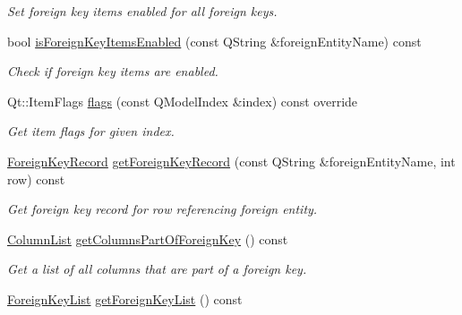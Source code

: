 \begin{DoxyCompactItemize}
\begin{DoxyCompactList}\small\item\em Set foreign key items enabled for all foreign keys. \end{DoxyCompactList}\item 
bool \hyperlink{class_mdt_1_1_item_model_1_1_foreign_key_proxy_model_a4386d35da6f92fc334166e159c7723ed}{is\+Foreign\+Key\+Items\+Enabled} (const Q\+String \&foreign\+Entity\+Name) const 
\begin{DoxyCompactList}\small\item\em Check if foreign key items are enabled. \end{DoxyCompactList}\item 
Qt\+::\+Item\+Flags \hyperlink{class_mdt_1_1_item_model_1_1_foreign_key_proxy_model_a0771f809a256b07ef5da42ef041eecaf}{flags} (const Q\+Model\+Index \&index) const override\hypertarget{class_mdt_1_1_item_model_1_1_foreign_key_proxy_model_a0771f809a256b07ef5da42ef041eecaf}{}\label{class_mdt_1_1_item_model_1_1_foreign_key_proxy_model_a0771f809a256b07ef5da42ef041eecaf}

\begin{DoxyCompactList}\small\item\em Get item flags for given index. \end{DoxyCompactList}\item 
\hyperlink{class_mdt_1_1_item_model_1_1_foreign_key_record}{Foreign\+Key\+Record} \hyperlink{class_mdt_1_1_item_model_1_1_foreign_key_proxy_model_a436611e101677f701e98149de521efb3}{get\+Foreign\+Key\+Record} (const Q\+String \&foreign\+Entity\+Name, int row) const 
\begin{DoxyCompactList}\small\item\em Get foreign key record for row referencing foreign entity. \end{DoxyCompactList}\item 
\hyperlink{class_mdt_1_1_item_model_1_1_column_list}{Column\+List} \hyperlink{class_mdt_1_1_item_model_1_1_foreign_key_proxy_model_a47df24ec15a396736946a3de697af50f}{get\+Columns\+Part\+Of\+Foreign\+Key} () const \hypertarget{class_mdt_1_1_item_model_1_1_foreign_key_proxy_model_a47df24ec15a396736946a3de697af50f}{}\label{class_mdt_1_1_item_model_1_1_foreign_key_proxy_model_a47df24ec15a396736946a3de697af50f}

\begin{DoxyCompactList}\small\item\em Get a list of all columns that are part of a foreign key. \end{DoxyCompactList}\item 
\hyperlink{class_mdt_1_1_item_model_1_1_foreign_key_list}{Foreign\+Key\+List} \hyperlink{class_mdt_1_1_item_model_1_1_foreign_key_proxy_model_a76d262092d818c3f00855049a6d6f67f}{get\+Foreign\+Key\+List} () const \hypertarget{class_mdt_1_1_item_model_1_1_foreign_key_proxy_model_a76d262092d818c3f00855049a6d6f67f}{}\label{class_mdt_1_1_item_model_1_1_foreign_key_proxy_model_a76d262092d818c3f00855049a6d6f67f}


\end{DoxyCompactItemize}
